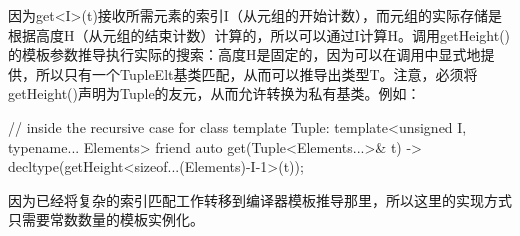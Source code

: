 因为get<I>(t)接收所需元素的索引I（从元组的开始计数），而元组的实际存储是根据高度H（从元组的结束计数）计算的，所以可以通过I计算H。调用getHeight()的模板参数推导执行实际的搜索：高度H是固定的，因为可以在调用中显式地提供，所以只有一个TupleElt基类匹配，从而可以推导出类型T。注意，必须将getHeight()声明为Tuple的友元，从而允许转换为私有基类。例如：

\begin{cpp}
// inside the recursive case for class template Tuple:
template<unsigned I, typename... Elements>
friend auto get(Tuple<Elements...>& t)
	-> decltype(getHeight<sizeof...(Elements)-I-1>(t));
\end{cpp}

因为已经将复杂的索引匹配工作转移到编译器模板推导那里，所以这里的实现方式只需要常数数量的模板实例化。









